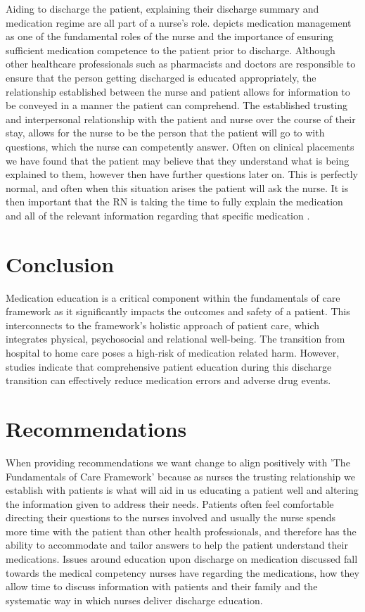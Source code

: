 \documentclass[british,12pt,a4paper]{article}
\begin{document}
	Aiding to discharge the patient, explaining their discharge summary and medication regime are all part of a nurse's role. \textcite{Sulosaari2014} depicts medication management as one of the fundamental roles of the nurse and the importance of ensuring sufficient medication competence to the patient prior to discharge. Although other healthcare professionals such as pharmacists and doctors are responsible to ensure that the person getting discharged is educated appropriately, the relationship established between the nurse and patient allows for information to be conveyed in a manner the patient can comprehend. The established trusting and interpersonal relationship with the patient and nurse over the course of their stay, allows for the nurse to be the person that the patient will go to with questions, which the nurse can competently answer. Often on clinical placements we have found that the patient may believe that they understand what is being explained to them, however then have further questions later on. This is perfectly normal, and often when this situation arises the patient will ask the nurse. It is then important that the RN is taking the time to fully explain the medication and all of the relevant information regarding that specific medication \parencite{Flatman2021}.
	\section{Conclusion}
	Medication education is a critical component within the fundamentals of care framework as it significantly impacts the outcomes and safety of a patient. This interconnects to the framework's holistic approach of patient care, which integrates physical, psychosocial and relational well-being. The transition from hospital to home care poses a high-risk of medication related harm. However, studies indicate that comprehensive patient education during this discharge transition can effectively reduce medication errors and adverse drug events.

	\section{Recommendations}
	When providing recommendations we want change to align positively with 'The Fundamentals of Care Framework' \parencite{Dempsey2013} because as nurses the trusting relationship we establish with patients is what will aid in us educating a patient well and altering the information given to address their needs. Patients often feel comfortable directing their questions to the nurses involved and usually the nurse spends more time with the patient than other health professionals, and therefore has the ability to accommodate and tailor answers to help the patient understand their medications. Issues around education upon discharge on medication discussed fall towards the medical competency nurses have regarding the medications, how they allow time to discuss information with patients and their family and the systematic way in which nurses deliver discharge education.
 
\end{document}
